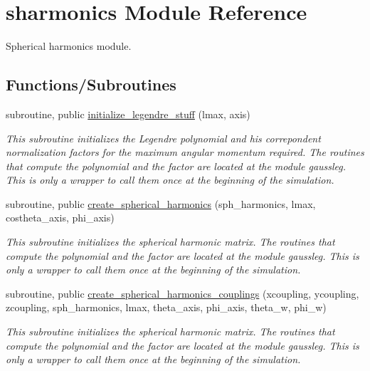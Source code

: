\hypertarget{namespacesharmonics}{}\section{sharmonics Module Reference}
\label{namespacesharmonics}


Spherical harmonics module.  


\subsection*{Functions/\+Subroutines}
\begin{DoxyCompactItemize}
\item 
subroutine, public \mbox{\hyperlink{namespacesharmonics_a3562b6c9f338ddd73debe9069c0a9efa}{initialize\+\_\+legendre\+\_\+stuff}} (lmax, axis)
\begin{DoxyCompactList}\small\item\em This subroutine initializes the Legendre polynomial and his correpondent normalization factors for the maximum angular momentum required. The routines that compute the polynomial and the factor are located at the module gaussleg. This is only a wrapper to call them once at the beginning of the simulation. \end{DoxyCompactList}\item 
subroutine, public \mbox{\hyperlink{namespacesharmonics_a1b0768c031d59eb8ff3c10e5173e995b}{create\+\_\+spherical\+\_\+harmonics}} (sph\+\_\+harmonics, lmax, costheta\+\_\+axis, phi\+\_\+axis)
\begin{DoxyCompactList}\small\item\em This subroutine initializes the spherical harmonic matrix. The routines that compute the polynomial and the factor are located at the module gaussleg. This is only a wrapper to call them once at the beginning of the simulation. \end{DoxyCompactList}\item 
subroutine, public \mbox{\hyperlink{namespacesharmonics_a138ab46d773e1ada5242bbb938180477}{create\+\_\+spherical\+\_\+harmonics\+\_\+couplings}} (xcoupling, ycoupling, zcoupling, sph\+\_\+harmonics, lmax, theta\+\_\+axis, phi\+\_\+axis, theta\+\_\+w, phi\+\_\+w)
\begin{DoxyCompactList}\small\item\em This subroutine initializes the spherical harmonic matrix. The routines that compute the polynomial and the factor are located at the module gaussleg. This is only a wrapper to call them once at the beginning of the simulation. \end{DoxyCompactList}\end{DoxyCompactItemize}
